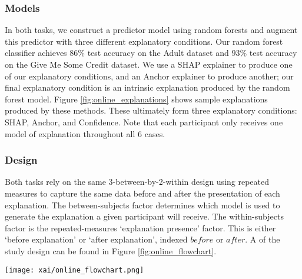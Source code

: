 \subsubsection{Models}
In both tasks, we construct a predictor model using random forests and augment this predictor with three different explanatory conditions. Our random forest classifier achieves $86\%$ test accuracy on the Adult dataset and $93\%$ test accuracy on the Give Me Some Credit dataset. We use a SHAP explainer to produce one of our explanatory conditions, and an Anchor explainer to produce another; our final explanatory condition is an intrinsic explanation produced by the random forest model. Figure \ref{fig:online_explanations} shows sample explanations produced by these methods. These ultimately form three explanatory conditions: SHAP, Anchor, and Confidence. Note that each participant only receives one model of explanation throughout all 6 cases. 

\subsubsection{Design}
Both tasks rely on the same 3-between-by-2-within design using repeated measures to capture the same data before and after the presentation of each explanation. The between-subjects factor determines which model is used to generate the explanation a given participant will receive. The within-subjects factor is the repeated-measures `explanation presence' factor. This is either `before explanation' or `after explanation', indexed $before$ or $after$. A of the study design can be found in Figure \ref{fig:online_flowchart}.

\begin{figure*}[htbp]
    \centering
    \texttt{[image: xai/online\_flowchart.png]}
    \caption{Participants in the online study are sorted into six buckets, where each bucket is segregated by explanatory condition and task and shown a brief description of the task (i.e., each participant sees only one of the explanations in Figure \ref{fig:online_explanations}). Then, each participant is shown 6 cases. In each case, participants are shown an applicant profile and a AI output. Participants are asked to agree or disagree with the AI output. Then, participants are given explanations based on their explanatory condition scores. They are then asked again to agree or disagree with the AI output.}
    \label{fig:online_flowchart}
\end{figure*}

